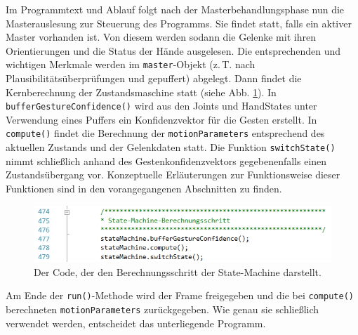 Im Programmtext und Ablauf folgt nach der Masterbehandlungsphase nun die Masterauslesung zur Steuerung des Programms. Sie findet statt, falls ein aktiver Master vorhanden ist. Von diesem werden sodann die Gelenke mit ihren Orientierungen und die Status der Hände ausgelesen. Die entsprechenden und wichtigen Merkmale werden im \texttt{master}-Objekt (z.\,T. nach Plausibilitätsüberprüfungen und gepuffert) abgelegt. Dann findet die Kernberechnung der Zustandsmaschine statt (siehe Abb. \ref{fig:ber}). In \texttt{bufferGestureConfidence()} wird aus den Joints und HandStates unter Verwendung eines Puffers ein Konfidenzvektor für die Gesten erstellt. In \texttt{compute()} findet die Berechnung der \texttt{motionParameters} entsprechend des aktuellen Zustands und der Gelenkdaten statt. Die Funktion \texttt{switchState()} nimmt schließlich anhand des Gestenkonfidenzvektors gegebenenfalls einen Zustandsübergang vor. Konzeptuelle Erläuterungen zur Funktionsweise dieser Funktionen sind in den vorangegangenen Abschnitten zu finden.\par\medskip
\begin{figure}[h]
\centering
\includegraphics[width=.8\textwidth]{pictures/statemachine-ber.png}
\caption{Der Code, der den Berechnungsschritt der State-Machine darstellt.}\label{fig:ber}
\end{figure}
Am Ende der \texttt{run()}-Methode wird der Frame freigegeben und die bei \texttt{compute()} berechneten \texttt{motionParameters} zurückgegeben. Wie genau sie schließlich verwendet werden, entscheidet das unterliegende Programm.
